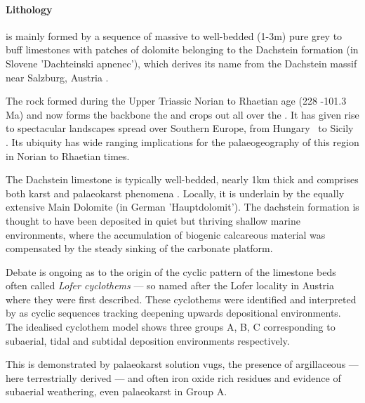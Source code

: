 \paragraph{Lithology}
\label{par:lithology}

 is mainly formed by a sequence of massive to well-bedded (1-3m) pure grey to buff limestones with patches of dolomite \citep{buser1986tolmavc} belonging to the Dachstein formation (in Slovene 'Dachteinski apnenec'), which derives its name from the Dachstein massif near Salzburg, Austria \citep{ogorelec1996dachstein}. 


The rock formed during the Upper Triassic Norian to Rhaetian age (228 -101.3 Ma) and now forms the backbone the  \citep{bosellini1974triassic} and crops out all over the  \citep{fischer1975tidal,schwarzacher2005stratification}. It has given rise to spectacular landscapes spread over Southern Europe, from Hungary \citep{haas2004characteristics} to Sicily \citep{catalano1974ciclotemi}.
Its ubiquity has wide ranging implications for the palaeogeography of this region in Norian to Rhaetian times.

The Dachstein limestone is typically well-bedded, nearly 1km thick and comprises both karst and palaeokarst phenomena \citep{ogorelec1996dachstein,haas2007characteristics}. Locally, it is underlain by the equally extensive Main Dolomite (in German 'Hauptdolomit'). The dachstein formation is thought to have been deposited in quiet but thriving shallow marine environments, where the accumulation of biogenic calcareous material was compensated by the steady sinking of the carbonate platform. 

Debate is ongoing as to the origin of the cyclic pattern of the limestone beds often called \emph{Lofer cyclothems} --- so named after the Lofer locality in Austria where they were first described. 
These cyclothems were identified and interpreted by \citet{fisher1964lofer} as cyclic sequences tracking deepening upwards depositional environments.
The idealised cyclothem model shows three groups A, B, C corresponding to  subaerial, tidal and subtidal deposition environments respectively.  

This is demonstrated by palaeokarst solution vugs, the presence of argillaceous --- here terrestrially derived --- and often iron oxide rich residues and evidence of subaerial weathering, even palaeokarst in Group A.

